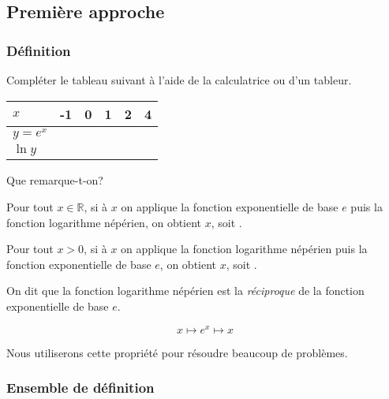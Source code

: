 \documentclass[a4paper,12pt]{scrartcl}
\begin{document}
\subsection{Première approche}

\subsubsection{Définition}

Compléter le tableau suivant à l'aide de la calculatrice ou d'un tableur.

\begin{center}
\begin{tabular}{|l|l|l|l|l|l|}
\hline
$x$      & -1 & 0 & 1 & 2 & 4 \\ \hline
$y = e^x$ &  \hspace{3em}  & \hspace{3em}  &  \hspace{3em} &  \hspace{3em} &  \hspace{3em} \\ \hline
$\ln y$   &    &   &   &   &   \\ \hline
\end{tabular}
\end{center}

Que remarque-t-on?


Pour tout $x \in \mathbb{R}$, si à $x$ on applique la fonction exponentielle de base $e$ puis la fonction logarithme népérien, on obtient $x$, soit .

Pour tout $x > 0$, si à $x$ on applique la fonction logarithme népérien puis la fonction exponentielle de base $e$, on obtient $x$, soit .

On dit que la fonction logarithme népérien est la \emph{réciproque} de la fonction exponentielle de base $e$.

\begin{equation*}
 x \longmapsto e^x \longmapsto x
\end{equation*}

Nous utiliserons cette propriété pour résoudre beaucoup de problèmes.

\subsubsection{Ensemble de définition}
\end{document}
